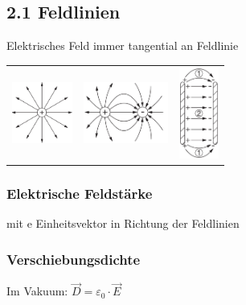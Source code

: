 \subsection{2.1 Feldlinien}
    Elektrisches Feld immer tangential an Feldlinie
    \begin{tabular}{c c c}
        \includegraphics[height = 20mm]{src/images/punktladung.png} & \includegraphics[height = 20mm]{src/images/zwei_punktladung.png} & \includegraphics[height = 30mm]{src/images/kondensator.png}
    \end{tabular}

    \subsubsection*{Elektrische Feldstärke}
         mit e Einheitsvektor in Richtung der Feldlinien

    \subsubsection*{Verschiebungsdichte}
        Im Vakuum: $\overrightarrow{D} = \varepsilon_0 \cdot \overrightarrow{E}$\\